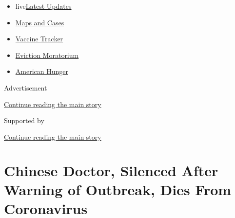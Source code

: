 \begin{itemize}
\tightlist
\item
  live\href{https://www.nytimes3xbfgragh.onion/2020/09/08/world/covid-19-coronavirus.html?name=styln-coronavirus-national\&region=TOP_BANNER\&block=storyline_menu_recirc\&action=click\&pgtype=Article\&impression_id=51fdae51-f1f6-11ea-9d6d-29bb2f94ebc1\&variant=undefined}{Latest
  Updates}
\item
  \href{https://www.nytimes3xbfgragh.onion/interactive/2020/us/coronavirus-us-cases.html?name=styln-coronavirus-national\&region=TOP_BANNER\&block=storyline_menu_recirc\&action=click\&pgtype=Article\&impression_id=51fdae52-f1f6-11ea-9d6d-29bb2f94ebc1\&variant=undefined}{Maps
  and Cases}
\item
  \href{https://www.nytimes3xbfgragh.onion/interactive/2020/science/coronavirus-vaccine-tracker.html?name=styln-coronavirus-national\&region=TOP_BANNER\&block=storyline_menu_recirc\&action=click\&pgtype=Article\&impression_id=51fdae53-f1f6-11ea-9d6d-29bb2f94ebc1\&variant=undefined}{Vaccine
  Tracker}
\item
  \href{https://www.nytimes3xbfgragh.onion/2020/09/02/your-money/eviction-moratorium-covid.html?name=styln-coronavirus-national\&region=TOP_BANNER\&block=storyline_menu_recirc\&action=click\&pgtype=Article\&impression_id=51fdae54-f1f6-11ea-9d6d-29bb2f94ebc1\&variant=undefined}{Eviction
  Moratorium}
\item
  \href{https://www.nytimes3xbfgragh.onion/interactive/2020/09/02/magazine/food-insecurity-hunger-us.html?name=styln-coronavirus-national\&region=TOP_BANNER\&block=storyline_menu_recirc\&action=click\&pgtype=Article\&impression_id=51fdae55-f1f6-11ea-9d6d-29bb2f94ebc1\&variant=undefined}{American
  Hunger}
\end{itemize}

Advertisement

\protect\hyperlink{after-top}{Continue reading the main story}

Supported by

\protect\hyperlink{after-sponsor}{Continue reading the main story}

\hypertarget{chinese-doctor-silenced-after-warning-of-outbreak-dies-from-coronavirus}{%
\section{Chinese Doctor, Silenced After Warning of Outbreak, Dies From
Coronavirus}\label{chinese-doctor-silenced-after-warning-of-outbreak-dies-from-coronavirus}}

